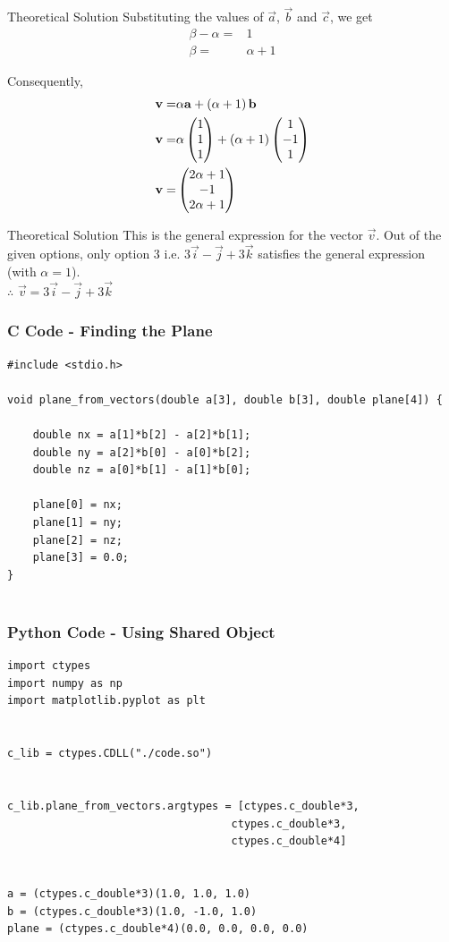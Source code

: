 \documentclass{beamer}
\begin{document}
\begin{frame}{Theoretical Solution}
Substituting the values of $\vec{a}$, $\vec{b}$ and $\vec{c}$, we get
\begin{align}
    \beta-\alpha =& 1\\
    \beta =& \alpha + 1
\end{align}

Consequently,
\begin{align}
    \mathbf{v} =& \alpha\mathbf{a} + \left(\alpha + 1\right)\mathbf{b}\\
    \mathbf{v} =& \alpha\begin{pmatrix}1\\1\\1\end{pmatrix} + \left(\alpha + 1\right)\begin{pmatrix}1\\-1\\1\end{pmatrix}\\
    \mathbf{v} =& \begin{pmatrix}2\alpha+1\\-1\\2\alpha+1\end{pmatrix}
\end{align}

\end{frame}

\begin{frame}{Theoretical Solution}
This is the general expression for the vector $\vec{v}$. Out of the given options, only option 3 i.e. $3\vec{i}-\vec{j}+3\vec{k}$ satisfies the general expression (with $\alpha = 1$).\\

$\therefore$ $\vec{v} = 3\vec{i}-\vec{j}+3\vec{k}$
\end{frame}

\begin{frame}[fragile]
    \frametitle{C Code - Finding the Plane}

    \begin{lstlisting}
#include <stdio.h>

void plane_from_vectors(double a[3], double b[3], double plane[4]) {
    
    double nx = a[1]*b[2] - a[2]*b[1];
    double ny = a[2]*b[0] - a[0]*b[2];
    double nz = a[0]*b[1] - a[1]*b[0];

    plane[0] = nx;
    plane[1] = ny;
    plane[2] = nz;
    plane[3] = 0.0;
}


    \end{lstlisting}

\end{frame}

\begin{frame}[fragile]
    \frametitle{Python Code - Using Shared Object}
    \begin{lstlisting}
import ctypes
import numpy as np
import matplotlib.pyplot as plt


c_lib = ctypes.CDLL("./code.so")


c_lib.plane_from_vectors.argtypes = [ctypes.c_double*3,
                                   ctypes.c_double*3,
                                   ctypes.c_double*4]


a = (ctypes.c_double*3)(1.0, 1.0, 1.0) 
b = (ctypes.c_double*3)(1.0, -1.0, 1.0)
plane = (ctypes.c_double*4)(0.0, 0.0, 0.0, 0.0)


\end{lstlisting}
\end{frame}
\end{document}
